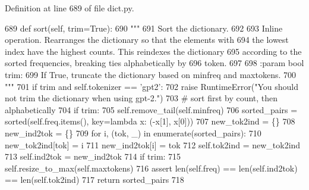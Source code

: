 Definition at line 689 of file dict.\+py.


\begin{DoxyCode}
689     \textcolor{keyword}{def }sort(self, trim=True):
690         \textcolor{stringliteral}{"""}
691 \textcolor{stringliteral}{        Sort the dictionary.}
692 \textcolor{stringliteral}{}
693 \textcolor{stringliteral}{        Inline operation. Rearranges the dictionary so that the elements with}
694 \textcolor{stringliteral}{        the lowest index have the highest counts. This reindexes the dictionary}
695 \textcolor{stringliteral}{        according to the sorted frequencies, breaking ties alphabetically by}
696 \textcolor{stringliteral}{        token.}
697 \textcolor{stringliteral}{}
698 \textcolor{stringliteral}{        :param bool trim:}
699 \textcolor{stringliteral}{            If True, truncate the dictionary based on minfreq and maxtokens.}
700 \textcolor{stringliteral}{        """}
701         \textcolor{keywordflow}{if} trim \textcolor{keywordflow}{and} self.tokenizer == \textcolor{stringliteral}{'gpt2'}:
702             \textcolor{keywordflow}{raise} RuntimeError(\textcolor{stringliteral}{"You should not trim the dictionary when using gpt-2."})
703         \textcolor{comment}{# sort first by count, then alphabetically}
704         \textcolor{keywordflow}{if} trim:
705             self.remove\_tail(self.minfreq)
706         sorted\_pairs = sorted(self.freq.items(), key=\textcolor{keyword}{lambda} x: (-x[1], x[0]))
707         new\_tok2ind = \{\}
708         new\_ind2tok = \{\}
709         \textcolor{keywordflow}{for} i, (tok, \_) \textcolor{keywordflow}{in} enumerate(sorted\_pairs):
710             new\_tok2ind[tok] = i
711             new\_ind2tok[i] = tok
712         self.tok2ind = new\_tok2ind
713         self.ind2tok = new\_ind2tok
714         \textcolor{keywordflow}{if} trim:
715             self.resize\_to\_max(self.maxtokens)
716         \textcolor{keyword}{assert} len(self.freq) == len(self.ind2tok) == len(self.tok2ind)
717         \textcolor{keywordflow}{return} sorted\_pairs
718 
\end{DoxyCode}
\mbox{\label{classparlai_1_1core_1_1dict_1_1DictionaryAgent_a437d3aacc7b55dac587643b271ba5f38}} 
